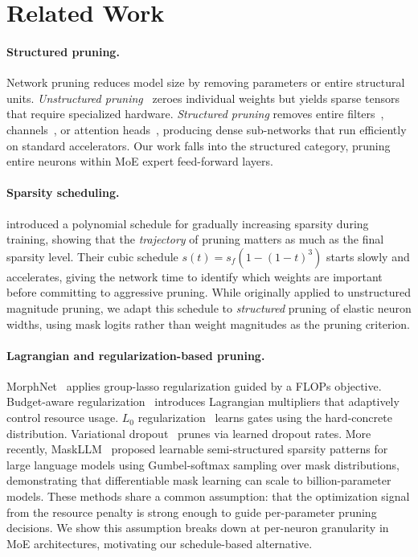\section{Related Work}
\label{sec:related}

\paragraph{Structured pruning.}
Network pruning reduces model size by removing parameters or entire structural units. \emph{Unstructured pruning}~\citep{han2015learning} zeroes individual weights but yields sparse tensors that require specialized hardware. \emph{Structured pruning} removes entire filters~\citep{li2017pruning}, channels~\citep{liu2017learning}, or attention heads~\citep{chen2021chasing,yu2022width}, producing dense sub-networks that run efficiently on standard accelerators. Our work falls into the structured category, pruning entire neurons within MoE expert feed-forward layers.

\paragraph{Sparsity scheduling.}
\citet{zhu2017prune} introduced a polynomial schedule for gradually increasing sparsity during training, showing that the \emph{trajectory} of pruning matters as much as the final sparsity level. Their cubic schedule $s(t) = s_f(1-(1-t)^3)$ starts slowly and accelerates, giving the network time to identify which weights are important before committing to aggressive pruning. While originally applied to unstructured magnitude pruning, we adapt this schedule to \emph{structured} pruning of elastic neuron widths, using mask logits rather than weight magnitudes as the pruning criterion.

\paragraph{Lagrangian and regularization-based pruning.}
MorphNet~\citep{gordon2018morphnet} applies group-lasso regularization guided by a FLOPs objective. Budget-aware regularization~\citep{lemaire2019structured} introduces Lagrangian multipliers that adaptively control resource usage. $L_0$ regularization~\citep{louizos2018learning} learns gates using the hard-concrete distribution. Variational dropout~\citep{molchanov2017variational} prunes via learned dropout rates. More recently, MaskLLM~\citep{fang2024maskllm} proposed learnable semi-structured sparsity patterns for large language models using Gumbel-softmax sampling over mask distributions, demonstrating that differentiable mask learning can scale to billion-parameter models. These methods share a common assumption: that the optimization signal from the resource penalty is strong enough to guide per-parameter pruning decisions. We show this assumption breaks down at per-neuron granularity in MoE architectures, motivating our schedule-based alternative.

